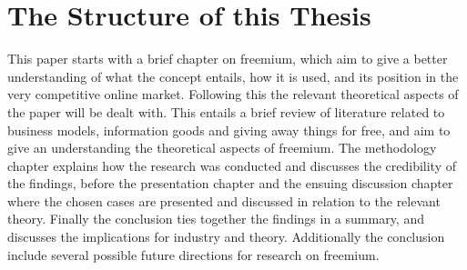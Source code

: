 
\section{The Structure of this Thesis}

This paper starts with a brief chapter on freemium, which aim to give a better understanding of what the concept entails, how it is used, and its position in the very competitive online market. Following this the relevant theoretical aspects of the paper will be dealt with. This entails a brief review of literature related to business models, information goods and giving away things for free, and aim to give an understanding the theoretical aspects of freemium. The methodology chapter explains how the research was conducted and discusses the credibility of the findings, before the presentation chapter and the ensuing discussion chapter where the chosen cases are presented and discussed in relation to the relevant theory. Finally the conclusion ties together the findings in a summary, and discusses the implications for industry and theory. Additionally the conclusion include several possible future directions for research on freemium.